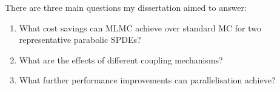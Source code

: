 \vspace{-0.5em}
There are three main questions my dissertation aimed to answer:

\begin{enumerate}
   \item What cost savings can MLMC achieve over standard MC 
   for two representative parabolic SPDEs?
   \item What are the effects of different coupling mechanisms?
   \item What further performance improvements can 
   parallelisation achieve?
\end{enumerate}
